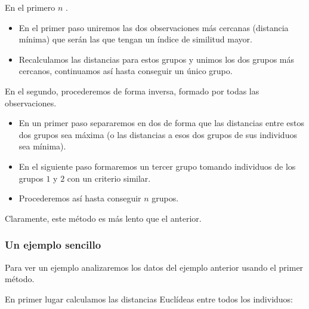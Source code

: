 En el primero  $n$ .
\begin{itemize}
\item En el primer paso uniremos las dos observaciones más cercanas (distancia mínima) que serán las que tengan un índice de similitud mayor.
\item Recalculamos las distancias para estos grupos y unimos los dos grupos más cercanos, continuamos así hasta conseguir un único grupo.
\end{itemize}
En el segundo, procederemos de forma inversa,  formado por todas las observaciones.
\begin{itemize}
\item En un primer paso separaremos en dos de forma que las distancias entre estos dos grupos sea máxima (o las distancias a esos dos grupos de sus individuos sea mínima).
\item En el siguiente paso formaremos un tercer grupo tomando individuos de los grupos $1$ y $2$ con un criterio similar.
\item Procederemos así hasta conseguir $n$ grupos.
\end{itemize}
Claramente, este método es más lento que el anterior.
\subsubsection{Un ejemplo sencillo}
Para ver un ejemplo analizaremos los datos del ejemplo anterior usando el primer método.

En primer lugar calculamos las distancias Euclídeas entre todos los individuos:

